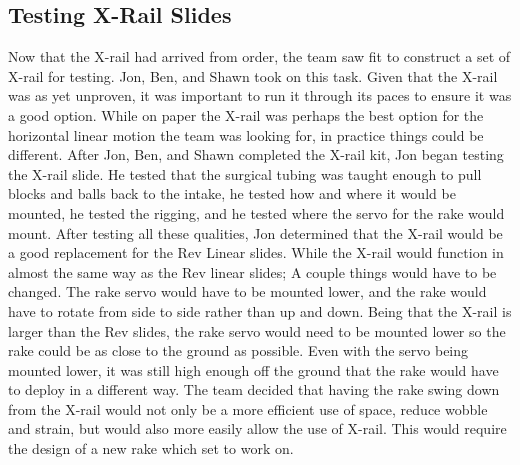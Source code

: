 \documentclass{article}
\begin{document}
\subsection{Testing X-Rail Slides}
Now that the X-rail had arrived from order, the team saw fit to construct a set of X-rail for testing. Jon, Ben, and Shawn took on this task. Given that the X-rail was as yet unproven, it was important to run it through its paces to ensure it was a good option. While on paper the X-rail was perhaps the best option for the horizontal linear motion the team was looking for, in practice things could be different. After Jon, Ben, and Shawn completed the X-rail kit, Jon began testing the X-rail slide. He tested that the surgical tubing was taught enough to pull blocks and balls back to the intake, he tested how and where it would be mounted, he tested the rigging, and he tested where the servo for the rake would mount. After testing all these qualities, Jon determined that the X-rail would be a good replacement for the Rev Linear slides. While the X-rail would function in almost the same way as the Rev linear slides; A couple things would have to be changed. The rake servo would have to be mounted lower, and the rake would have to rotate from side to side rather than up and down. Being that the X-rail is larger than the Rev slides, the rake servo would need to be mounted lower so the rake could be as close to the ground as possible. Even with the servo being mounted lower, it was still high enough off the ground that the rake would have to deploy in a different way. The team decided that having the rake swing down from the X-rail would not only be a more efficient use of space, reduce wobble and strain, but would also more easily allow the use of X-rail. This would require the design of a new rake which set to work on. 
\end{document}
